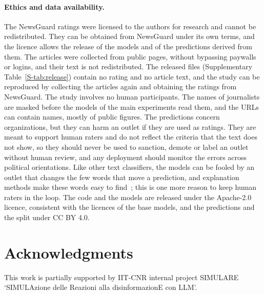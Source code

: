 \documentclass[11pt,a4paper]{article}
\begin{document}
\paragraph{Ethics and data availability.}
The NewsGuard ratings were licensed to the authors for research and cannot be redistributed. They can be obtained from
NewsGuard under its own terms, and the licence allows the release of the models and of the predictions derived from
them. The articles were collected from public pages, without bypassing paywalls or logins, and their text is not
redistributed. The released files (Supplementary Table~\ref{S-tab:release}) contain no rating and no article text, and the study can
be reproduced by collecting the articles again and
obtaining the ratings from NewsGuard. The study involves no human participants. The names of journalists are masked
before the models of the main experiments read them, and the URLs can contain names, mostly of public figures. The
predictions concern organizations, but they can harm an outlet if they are used as ratings. They are meant to support
human raters and do not reflect the criteria that the text does not show, so they should never be used to sanction,
demote or label an outlet without human review, and any deployment should monitor the errors across political
orientations. Like other text classifiers, the models can be fooled by an outlet that changes the few words that move a
prediction, and explanation methods make these words easy to find~\cite{kozik2024explainability}; this is one more
reason to keep human raters in the loop. The code and the models are released under the Apache-2.0 licence, consistent
with the licences of the base models, and the predictions and the split under CC BY 4.0.

\section*{Acknowledgments}
This work is partially supported by IIT-CNR internal project SIMULARE `SIMULAzione delle Reazioni alla
disinformazionE con LLM'.



\end{document}
